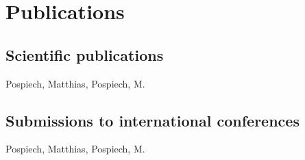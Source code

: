 
\chapter*{Publications}



\section*{Scientific publications}
\begin{refsection}
\nocite{Siegel2007, Palmer2010, Pospiech2009, Pospiech2010, Pospiech2011}
\forcsvlist{\listadd\bibboldnames}
  {{Pospiech, Matthias}, {Pospiech, M.}}
\printbibliography[env=numbered+bold, heading=none, sorting=ynt, resetnumbers=true]
\end{refsection}

\section*{Submissions to international conferences}
\begin{refsection}
\nocite{Morgner2008, Palmer2008a, Siegel2008,Pospiech2009a,Pospiech2010b,Pospiech2010a}
\forcsvlist{\listadd\bibboldnames}
  {{Pospiech, Matthias}, {Pospiech, M.}}
\printbibliography[env=numbered+bold, heading=none, sorting=ynt, resetnumbers=true]
\end{refsection}

